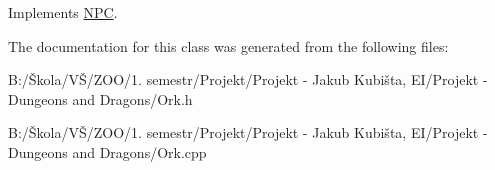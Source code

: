 Implements \hyperlink{class_n_p_c_a3987735754198ab346e6dc09a5d24bbf}{N\-P\-C}.



The documentation for this class was generated from the following files\-:\begin{DoxyCompactItemize}
\item 
B\-:/Škola/\-VŠ/\-Z\-O\-O/1. semestr/\-Projekt/\-Projekt -\/ Jakub Kubišta, E\-I/\-Projekt -\/ Dungeons and Dragons/Ork.\-h\item 
B\-:/Škola/\-VŠ/\-Z\-O\-O/1. semestr/\-Projekt/\-Projekt -\/ Jakub Kubišta, E\-I/\-Projekt -\/ Dungeons and Dragons/Ork.\-cpp\end{DoxyCompactItemize}
